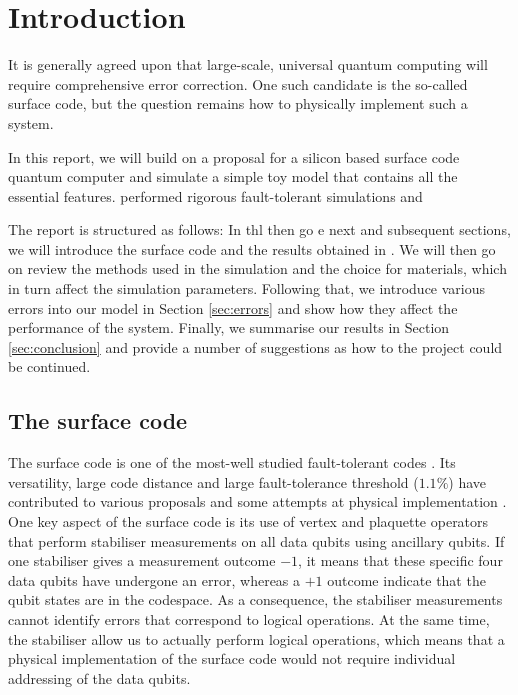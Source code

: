 
\section{Introduction} \label{sec:Introduction}

It is generally agreed upon that large-scale, universal quantum computing will require comprehensive error correction. One such candidate is the so-called surface code, but the question remains how to physically implement such a system. 

In this report, we will build on a proposal for a silicon based surface code quantum computer and simulate a simple toy model that contains all the essential features. \citet{OGorman2016} performed rigorous fault-tolerant simulations and 




The report is structured as follows: In thl then go e next and subsequent sections, we will introduce the surface code and the results obtained in \cite{the paper}. We will then go on review the methods used in the simulation and the choice for materials, which in turn affect the simulation parameters. Following that, we introduce various errors into our model in Section \ref{sec:errors} and show how they affect the performance of the system. Finally, we summarise our results in Section \ref{sec:conclusion} and provide a number of suggestions as how to the project could be continued. 

\subsection{The surface code}
The surface code is one of the most-well studied fault-tolerant codes \cite{Wang2011,Fowler2012}. Its versatility, large code distance and large fault-tolerance threshold ($1.1\%$) have contributed to various proposals \cite{Fowler2012,Pica2014,Tosi2015,Hill2015,OGorman2016} and some attempts at physical implementation \cite{Barends2014,Kelly2015}. One key aspect of the surface code is its use of vertex and plaquette operators that perform stabiliser measurements on all data qubits using ancillary qubits. If one stabiliser gives a measurement outcome $-1$, it means that these specific four data qubits have undergone an error, whereas a $+1$ outcome indicate that the qubit states are in the codespace. As a consequence, the stabiliser measurements cannot identify errors that correspond to logical operations. At the same time, the stabiliser allow us to actually perform logical operations, which means that a physical implementation of the surface code would not require individual addressing of the data qubits. 

